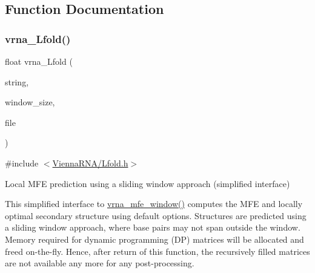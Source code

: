 \subsection{Function Documentation}
\mbox{\label{group__local__mfe__fold_ga4918cce52bf69c1913cda503b2ac75d8}} 
\subsubsection{\texorpdfstring{vrna\+\_\+\+Lfold()}{vrna\_Lfold()}}
{\footnotesize\ttfamily float vrna\+\_\+\+Lfold (\begin{DoxyParamCaption}\item[{const char $\ast$}]{string,  }\item[{int}]{window\+\_\+size,  }\item[{F\+I\+LE $\ast$}]{file }\end{DoxyParamCaption})}



{\ttfamily \#include $<$\hyperlink{Lfold_8h}{Vienna\+R\+N\+A/\+Lfold.\+h}$>$}



Local M\+FE prediction using a sliding window approach (simplified interface) 

This simplified interface to \hyperlink{group__local__mfe__fold_ga689df235a1915a1ad56e377383c044ce}{vrna\+\_\+mfe\+\_\+window()} computes the M\+FE and locally optimal secondary structure using default options. Structures are predicted using a sliding window approach, where base pairs may not span outside the window. Memory required for dynamic programming (DP) matrices will be allocated and free\textquotesingle{}d on-\/the-\/fly. Hence, after return of this function, the recursively filled matrices are not available any more for any post-\/processing.

